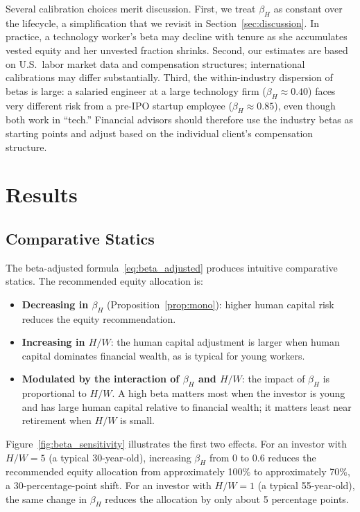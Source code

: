 \documentclass[11pt]{article}
\begin{document}
Several calibration choices merit discussion. First, we treat $\beta_H$ as
constant over the lifecycle, a simplification that we revisit in
Section~\ref{sec:discussion}. In practice, a technology worker's beta may
decline with tenure as she accumulates vested equity and her unvested
fraction shrinks. Second, our estimates are based on U.S.\ labor market
data and compensation structures; international calibrations may differ
substantially. Third, the within-industry dispersion of betas is large:
a salaried engineer at a large technology firm ($\beta_H \approx 0.40$)
faces very different risk from a pre-IPO startup employee
($\beta_H \approx 0.85$), even though both work in ``tech.'' Financial
advisors should therefore use the industry betas as starting points and
adjust based on the individual client's compensation structure.


\section{Results}\label{sec:results}

\subsection{Comparative Statics}\label{sec:statics}

The beta-adjusted formula~\eqref{eq:beta_adjusted} produces intuitive
comparative statics. The recommended equity allocation is:
\begin{itemize}
  \item \textbf{Decreasing in $\beta_H$}
    (Proposition~\ref{prop:mono}): higher human capital risk reduces the
    equity recommendation.
  \item \textbf{Increasing in $H/W$}: the human capital adjustment is
    larger when human capital dominates financial wealth, as is typical
    for young workers.
  \item \textbf{Modulated by the interaction of $\beta_H$ and $H/W$}:
    the impact of $\beta_H$ is proportional to $H/W$. A high beta matters
    most when the investor is young and has large human capital relative to
    financial wealth; it matters least near retirement when $H/W$ is small.
\end{itemize}

Figure~\ref{fig:beta_sensitivity} illustrates the first two effects.
For an investor with $H/W = 5$ (a typical 30-year-old), increasing
$\beta_H$ from 0 to 0.6 reduces the recommended equity allocation from
approximately 100\% to approximately 70\%, a 30-percentage-point shift.
For an investor with $H/W = 1$ (a typical 55-year-old), the same change in
$\beta_H$ reduces the allocation by only about 5 percentage points.
\end{document}
